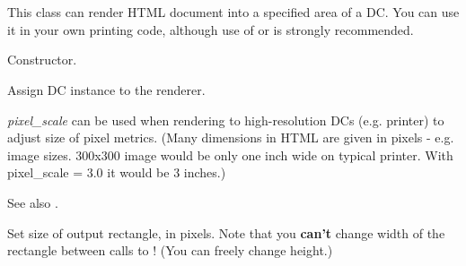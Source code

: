 %
%

\section{}\label{wxhtmldcrenderer}

This class can render HTML document into a specified area of a DC. You can use it
in your own printing code, although use of  
or  is strongly recommended.




\label{wxhtmldcrendererwxhtmldcrenderer}


Constructor.

\label{wxhtmldcrenderersetdc}


Assign DC instance to the renderer.

{\it pixel_scale} can be used when rendering to high-resolution DCs (e.g. printer) to adjust size of pixel metrics.
(Many dimensions in HTML are given in pixels - e.g. image sizes. 300x300 image would be only one
inch wide on typical printer. With pixel_scale = 3.0 it would be 3 inches.)



See also .

\label{wxhtmldcrenderersetsize}


Set size of output rectangle, in pixels. Note that you {\bf can't} change
width of the rectangle between calls to !
(You can freely change height.)

